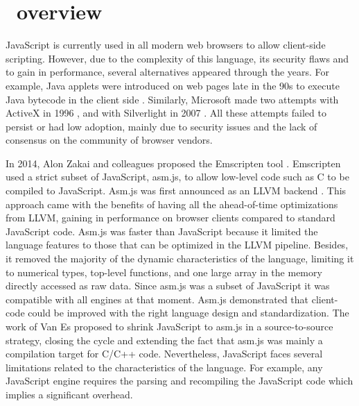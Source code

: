 \section{\wasm\ overview}
\label{sota:wasm}

\newcommand{\lstnumberautorefname}{Line}
\newcommand{\lineref}[1]{\autoref{#1}}




JavaScript is currently used in all modern web browsers to allow client-side scripting. However, due to the complexity of this language, its security flaws and to gain in performance, several alternatives appeared through the years.  For example, Java applets were introduced on web pages late in the 90s to execute Java bytecode in the client side \cite{javaapplet}. Similarly, Microsoft made two attempts with ActiveX in 1996 \cite{activex}, and with Silverlight in 2007 \cite{silverlight}. All these attempts failed to persist or had low adoption, mainly due to security issues and the lack of consensus on the community of browser vendors.

In 2014, Alon Zakai and colleagues proposed the Emscripten tool \cite{emscripten}. Emscripten used a strict subset of JavaScript, asm.js, to allow low-level code such as C to be compiled to JavaScript. Asm.js was first announced as an LLVM backend \cite{asmjsweb}. This approach came with the benefits of having all the ahead-of-time optimizations from LLVM, gaining in performance on browser clients \cite{asmjs} compared to standard JavaScript code. Asm.js was faster than JavaScript because it limited the language features to those that can be optimized in the LLVM pipeline. Besides, it removed the majority of the dynamic characteristics of the language, limiting it to numerical types, top-level functions, and one large array in the memory directly accessed as raw data. Since asm.js was a subset of JavaScript it was compatible with all engines at that moment. Asm.js demonstrated that client-code could be improved with the right language design and standardization.
The work of Van Es \etal \cite{EsAsm.js} proposed to shrink JavaScript to asm.js in a source-to-source strategy, closing the cycle and extending the fact that asm.js was mainly a compilation target for C/C++ code. 
%
Nevertheless, JavaScript faces several limitations related to the characteristics of the language. For example, any JavaScript engine requires the parsing and recompiling the JavaScript code which implies a significant overhead.


